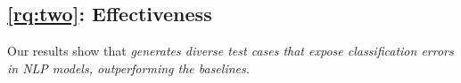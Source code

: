 




\subsection{\ref{rq:two}: Effectiveness}
Our results show that \emph{\tool generates diverse test cases that expose classification errors in NLP models, outperforming the baselines.}

